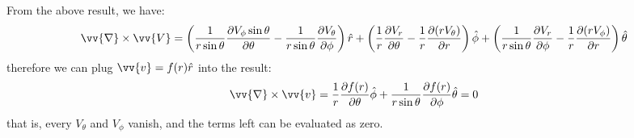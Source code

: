 \documentclass{article}
\newcommand{\de}{\mathrm{d}}
\begin{document}
\begin{enumerate}
\begin{enumerate}
        From the above result, we have:
        \[
        \vv{\nabla} \times \vv{V} = 
          \left(\frac{1}{r\sin\theta}\frac{\partial V_\phi \sin\theta}{\partial\theta} - \frac{1}{r\sin\theta}\frac{\partial V_\theta}{\partial \phi}\right) \hat{r}
        + \left(\frac{1}{r}\frac{\partial V_r}{\partial\theta} -\frac{1}{r}\frac{\partial (r V_\theta)}{\partial r}\right)\hat{\phi} 
        + \left(\frac{1}{r\sin\theta}\frac{\partial V_r}{\partial \phi} - \frac{1}{r}\frac{\partial (r V_\phi)}{\partial r}\right)\hat{\theta}
        \]
        therefore we can plug $\vv{v} = f(r)\hat{r}$ into the result:
        \[
            \vv{\nabla} \times \vv{v} = 
          \frac{1}{r}\frac{\partial f(r)}{\partial\theta}\hat{\phi} 
        + \frac{1}{r\sin\theta}\frac{\partial f(r)}{\partial \phi}\hat{\theta} = 0
        \]
        that is, every $V_\theta$ and $V_\phi$ vanish, and the terms left can be evaluated as zero.
    \end{enumerate}
\end{enumerate}
      




\end{document}
